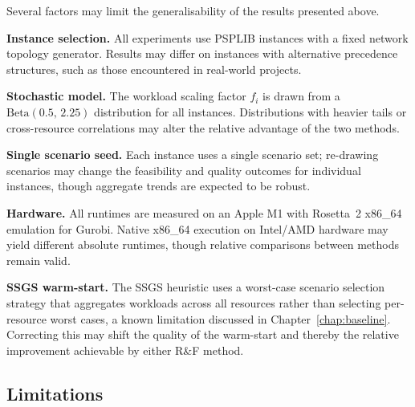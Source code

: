 Several factors may limit the generalisability of the results
presented above.

\textbf{Instance selection.}
All experiments use PSPLIB instances with a fixed network
topology generator. Results may differ on instances with
alternative precedence structures, such as those encountered
in real-world projects.

\textbf{Stochastic model.}
The workload scaling factor $f_i$ is drawn from a
$\mathrm{Beta}(0.5,\,2.25)$ distribution for all instances.
Distributions with heavier tails or cross-resource
correlations may alter the relative advantage of the two
methods.

\textbf{Single scenario seed.}
Each instance uses a single scenario set; re-drawing scenarios
may change the feasibility and quality outcomes for individual
instances, though aggregate trends are expected to be robust.

\textbf{Hardware.}
All runtimes are measured on an Apple M1 with Rosetta~2 x86\_64
emulation for Gurobi. Native x86\_64 execution on Intel/AMD
hardware may yield different absolute runtimes, though relative
comparisons between methods remain valid.

\textbf{SSGS warm-start.}
The SSGS heuristic uses a worst-case scenario selection
strategy that aggregates workloads across all resources rather
than selecting per-resource worst cases, a known limitation
discussed in Chapter~\ref{chap:baseline}. Correcting this may
shift the quality of the warm-start and thereby the relative
improvement achievable by either R\&F method.

\subsection{Limitations}
\label{subsec:limitations}


